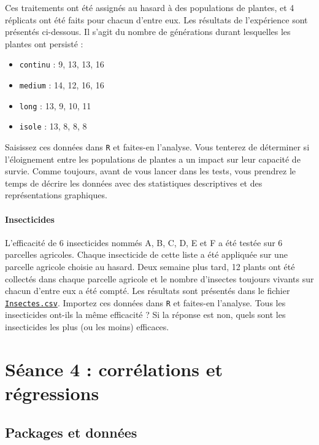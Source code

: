 \documentclass[a4paperpaper,]{article}
\providecommand{\tightlist}{%
  \setlength{\itemsep}{0pt}\setlength{\parskip}{0pt}}
\let\oldparagraph\paragraph
\renewcommand{\paragraph}[1]{\oldparagraph{#1}\mbox{}}
\begin{document}
Ces traitements ont été assignés au hasard à des populations de plantes, et 4 réplicats ont été faits pour chacun d'entre eux. Les résultats de l'expérience sont présentés ci-dessous. Il s'agit du nombre de générations durant lesquelles les plantes ont persisté :

\begin{itemize}
\tightlist
\item
  \texttt{continu} : 9, 13, 13, 16
\item
  \texttt{medium} : 14, 12, 16, 16
\item
  \texttt{long} : 13, 9, 10, 11
\item
  \texttt{isole} : 13, 8, 8, 8
\end{itemize}

Saisissez ces données dans \texttt{R} et faites-en l'analyse. Vous tenterez de déterminer si l'éloignement entre les populations de plantes a un impact sur leur capacité de survie. Comme toujours, avant de vous lancer dans les tests, vous prendrez le temps de décrire les données avec des statistiques descriptives et des représentations graphiques.

\hypertarget{insecticides}{%
\paragraph{Insecticides}\label{insecticides}}

L'efficacité de 6 insecticides nommés A, B, C, D, E et F a été testée sur 6 parcelles agricoles. Chaque insecticide de cette liste a été appliquée sur une parcelle agricole choisie au hasard. Deux semaine plus tard, 12 plants ont été collectés dans chaque parcelle agricole et le nombre d'insectes toujours vivants sur chacun d'entre eux a été compté. Les résultats sont présentés dans le fichier \href{https://besibo.github.io/Biometrie3/data/Insectes.csv}{\texttt{Insectes.csv}}. Importez ces données dans \texttt{R} et faites-en l'analyse. Tous les insecticides ont-ils la même efficacité ? Si la réponse est non, quels sont les insecticides les plus (ou les moins) efficaces.

\hypertarget{suxe9ance-4-corruxe9lations-et-ruxe9gressions}{%
\section{Séance 4 : corrélations et régressions}\label{suxe9ance-4-corruxe9lations-et-ruxe9gressions}}

\hypertarget{packages-et-donnuxe9es-1}{%
\subsection{Packages et données}\label{packages-et-donnuxe9es-1}}
\end{document}
